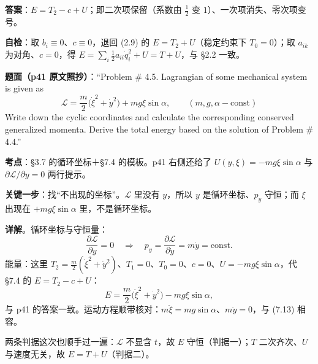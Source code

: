 \documentclass[11pt]{ctexart}
\begin{document}

\textbf{答案}：$E=T_2-c+U$；即二次项保留（系数由 $\frac12$ 变 $1$）、一次项消失、零次项变号。

\textbf{自检}：取 $b_i\equiv0$、$c\equiv0$，退回 (2.9) 的 $E=T_2+U$（稳定约束下 $T_0=0$）；取 $a_{ik}$ 为对角、$c=0$，得 $E=\sum_i\frac12a_{ii}\dot q_i^2+U=T+U$，与 §2.2 一致。


\textbf{题面（p41 原文照抄）}：“Problem \# 4.5. Lagrangian of some mechanical system is given as
\[
\mathcal{L}=\frac{m}{2}\bigl(\dot\xi^2+\dot y^2\bigr)+mg\xi\sin\alpha,\qquad (m,g,\alpha-\text{const})
\]
Write down the cyclic coordinates and calculate the corresponding conserved generalized momenta. Derive the total energy based on the solution of Problem \# 4.4.”

\textbf{考点}：§3.7 的循环坐标＋§7.4 的模板。p41 右侧还给了 $U(y,\xi)=-mg\xi\sin\alpha$ 与 $\partial\mathcal{L}/\partial y=0$ 两行提示。

\textbf{关键一步}：找“不出现的坐标”。$\mathcal{L}$ 里没有 $y$，所以 $y$ 是循环坐标、$p_y$ 守恒；而 $\xi$ 出现在 $+mg\xi\sin\alpha$ 里，不是循环坐标。

\textbf{详解}。循环坐标与守恒量：
\[
\frac{\partial\mathcal{L}}{\partial y}=0\quad\Longrightarrow\quad
p_y=\frac{\partial\mathcal{L}}{\partial\dot y}=m\dot y=\text{const} . \tag{7.13}
\]
能量：这里 $T_2=\frac{m}{2}(\dot\xi^2+\dot y^2)$、$T_1=0$、$T_0=0$、$c=0$、$U=-mg\xi\sin\alpha$，代 §7.4 的 $E=T_2-c+U$：
\[
E=\frac{m}{2}\bigl(\dot\xi^2+\dot y^2\bigr)-mg\xi\sin\alpha , \tag{7.14}
\]
与 p41 的答案一致。运动方程顺带核对：$m\ddot\xi=mg\sin\alpha$、$m\ddot y=0$，与 (7.13) 相容。


两条判据这次也顺手过一遍：$\mathcal{L}$ 不显含 $t$，故 $E$ 守恒（判据一）；$T$ 二次齐次、$U$ 与速度无关，故 $E=T+U$（判据二）。
\end{document}
